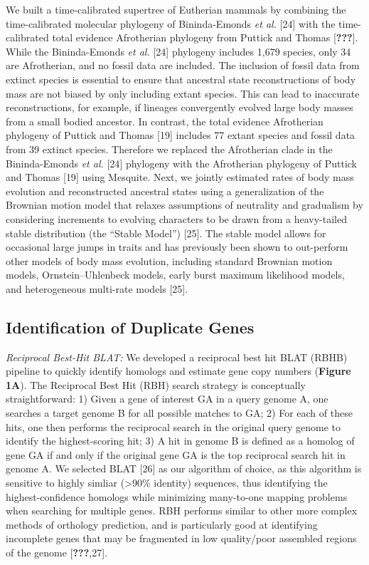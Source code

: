 \documentclass[10pt,letterpaper]{article}
\begin{document}
We built a time-calibrated supertree of Eutherian mammals by combining
the time-calibrated molecular phylogeny of Bininda-Emonds \emph{et al.}
{[}24{]} with the time-calibrated total evidence Afrotherian phylogeny
from Puttick and Thomas {[}{\textbf{???}}{]}. While the Bininda-Emonds
\emph{et al.} {[}24{]} phylogeny includes 1,679 species, only 34 are
Afrotherian, and no fossil data are included. The inclusion of fossil
data from extinct species is essential to ensure that ancestral state
reconstructions of body mass are not biased by only including extant
species. This can lead to inaccurate reconstructions, for example, if
lineages convergently evolved large body masses from a small bodied
ancestor. In contrast, the total evidence Afrotherian phylogeny of
Puttick and Thomas {[}19{]} includes 77 extant species and fossil data
from 39 extinct species. Therefore we replaced the Afrotherian clade in
the Bininda-Emonds \emph{et al.} {[}24{]} phylogeny with the Afrotherian
phylogeny of Puttick and Thomas {[}19{]} using Mesquite. Next, we
jointly estimated rates of body mass evolution and reconstructed
ancestral states using a generalization of the Brownian motion model
that relaxes assumptions of neutrality and gradualism by considering
increments to evolving characters to be drawn from a heavy-tailed stable
distribution (the ``Stable Model'') {[}25{]}. The stable model allows
for occasional large jumps in traits and has previously been shown to
out-perform other models of body mass evolution, including standard
Brownian motion models, Ornstein--Uhlenbeck models, early burst maximum
likelihood models, and heterogeneous multi-rate models {[}25{]}.

\hypertarget{identification-of-duplicate-genes}{%
\subsection{Identification of Duplicate
Genes}\label{identification-of-duplicate-genes}}

\emph{Reciprocal Best-Hit BLAT:} We developed a reciprocal best hit BLAT
(RBHB) pipeline to quickly identify homologs and estimate gene copy
numbers (\textbf{Figure 1A}). The Reciprocal Best Hit (RBH) search
strategy is conceptually straightforward: 1) Given a gene of interest GA
in a query genome A, one searches a target genome B for all possible
matches to GA; 2) For each of these hits, one then performs the
reciprocal search in the original query genome to identify the
highest-scoring hit; 3) A hit in genome B is defined as a homolog of
gene GA if and only if the original gene GA is the top reciprocal search
hit in genome A. We selected BLAT {[}26{]} as our algorithm of choice,
as this algorithm is sensitive to highly simliar (\textgreater{}90\%
identity) sequences, thus identifying the highest-confidence homologs
while minimizing many-to-one mapping problems when searching for
multiple genes. RBH performs similar to other more complex methods of
orthology prediction, and is particularly good at identifying incomplete
genes that may be fragmented in low quality/poor assembled regions of
the genome {[}{\textbf{???}},27{]}.
\end{document}
